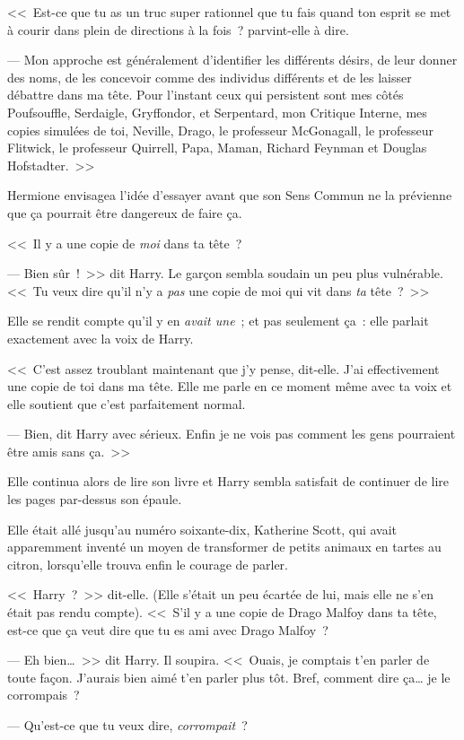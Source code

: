 <<~Est-ce que tu as un truc super rationnel que tu fais quand ton esprit se met à courir dans plein de directions à la fois~? parvint-elle à dire.

--- Mon approche est généralement d'identifier les différents désirs, de leur donner des noms, de les concevoir comme des individus différents et de les laisser débattre dans ma tête. Pour l'instant ceux qui persistent sont mes côtés Poufsouffle, Serdaigle, Gryffondor, et Serpentard, mon Critique Interne, mes copies simulées de toi, Neville, Drago, le professeur McGonagall, le professeur Flitwick, le professeur Quirrell, Papa, Maman, Richard Feynman et Douglas Hofstadter.~>>

Hermione envisagea l'idée d'essayer avant que son Sens Commun ne la prévienne que ça pourrait être dangereux de faire ça.

<<~Il y a une copie de \emph{moi} dans ta tête~?

--- Bien sûr~!~>> dit Harry. Le garçon sembla soudain un peu plus vulnérable. <<~Tu veux dire qu'il n'y a \emph{pas} une copie de moi qui vit dans \emph{ta} tête~?~>>

Elle se rendit compte qu'il y en \emph{avait une}~; et pas seulement ça~: elle parlait exactement avec la voix de Harry.

<<~C'est assez troublant maintenant que j'y pense, dit-elle. J'ai effectivement une copie de toi dans ma tête. Elle me parle en ce moment même avec ta voix et elle soutient que c'est parfaitement normal.

--- Bien, dit Harry avec sérieux. Enfin je ne vois pas comment les gens pourraient être amis sans ça.~>>

Elle continua alors de lire son livre et Harry sembla satisfait de continuer de lire les pages par-dessus son épaule.

Elle était allé jusqu'au numéro soixante-dix, Katherine Scott, qui avait apparemment inventé un moyen de transformer de petits animaux en tartes au citron, lorsqu'elle trouva enfin le courage de parler.

<<~Harry~?~>> dit-elle. (Elle s'était un peu écartée de lui, mais elle ne s'en était pas rendu compte). <<~S'il y a une copie de Drago Malfoy dans ta tête, est-ce que ça veut dire que tu es ami avec Drago Malfoy~?

--- Eh bien…~>> dit Harry. Il soupira. <<~Ouais, je comptais t'en parler de toute façon. J'aurais bien aimé t'en parler plus tôt. Bref, comment dire ça… je le corrompais~?

--- Qu'est-ce que tu veux dire, \emph{corrompait}~?

